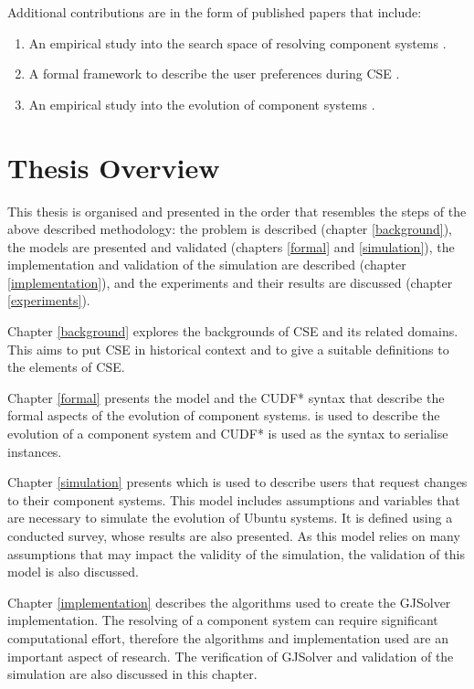 Additional contributions are in the form of published papers that include:
\begin{enumerate}
  \item An empirical study into the search space of resolving component systems \citep{Jenson2010}.
  \item A formal framework to describe the user preferences during CSE \citep{Jenson2010a}.
  \item An empirical study into the evolution of component systems \citep{jenson2011}.
\end{enumerate}

\section{Thesis Overview}
This thesis is organised and presented in the order that resembles the steps of the above described methodology:
the problem is described (chapter \ref{background}), the models are presented and validated (chapters \ref{formal} and \ref{simulation}),
the implementation and validation of the simulation are described (chapter \ref{implementation}), and the experiments and their results are discussed (chapter \ref{experiments}).  

Chapter \ref{background} explores the backgrounds of CSE and its related domains.
This aims to put CSE in historical context and to give a suitable definitions to the elements of CSE.

Chapter \ref{formal} presents the \modelname model and the CUDF* syntax that describe the formal aspects of the evolution of component systems.
\modelname is used to describe the evolution of a component system and CUDF* is used as the syntax to serialise \modelname instances.

Chapter \ref{simulation} presents \usermodel which is used to describe users that request changes to their component systems.
This model includes assumptions and variables that are necessary to simulate the evolution of Ubuntu systems. 
It is defined using a conducted survey, whose results are also presented.
As this model relies on many assumptions that may impact the validity of the simulation, the validation of this model is also discussed. 

Chapter \ref{implementation} describes the algorithms used to create the GJSolver implementation.
The resolving of a component system can require significant computational effort,
therefore the algorithms and implementation used are an important aspect of research.
The verification of GJSolver and validation of the simulation are also discussed in this chapter.

